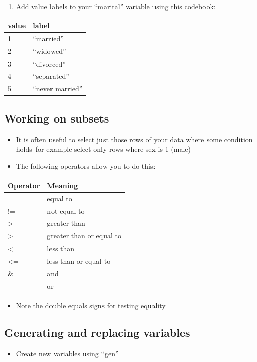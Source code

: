 \documentclass[]{book}
\providecommand{\tightlist}{%
  \setlength{\itemsep}{0pt}\setlength{\parskip}{0pt}}
\begin{document}
\begin{enumerate}
\def\labelenumi{\arabic{enumi}.}
\tightlist
\item
  Add value labels to your ``marital'' variable using this codebook:
\end{enumerate}

\begin{longtable}[]{@{}ll@{}}
\toprule
\textbf{value} & \textbf{label}\tabularnewline
\midrule
\endhead
1 & ``married''\tabularnewline
2 & ``widowed''\tabularnewline
3 & ``divorced''\tabularnewline
4 & ``separated''\tabularnewline
5 & ``never married''\tabularnewline
\bottomrule
\end{longtable}

\subsection{Working on subsets}\label{working-on-subsets}

\begin{itemize}
\tightlist
\item
  It is often useful to select just those rows of your data where some
  condition holds--for example select only rows where sex is 1 (male)
\item
  The following operators allow you to do this:
\end{itemize}

\begin{longtable}[]{@{}ll@{}}
\toprule
Operator & Meaning\tabularnewline
\midrule
\endhead
== & equal to\tabularnewline
!= & not equal to\tabularnewline
\textgreater{} & greater than\tabularnewline
\textgreater{}= & greater than or equal to\tabularnewline
\textless{} & less than\tabularnewline
\textless{}= & less than or equal to\tabularnewline
\& & and\tabularnewline
& or\tabularnewline
\bottomrule
\end{longtable}

\begin{itemize}
\tightlist
\item
  Note the double equals signs for testing equality
\end{itemize}

\subsection{Generating and replacing
variables}\label{generating-and-replacing-variables}

\begin{itemize}
\tightlist
\item
  Create new variables using ``gen''
\end{itemize}
\end{document}
